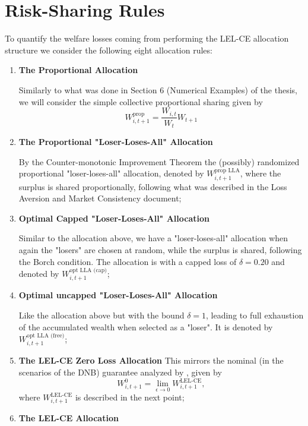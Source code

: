 \documentclass[11pt,a4paper]{article}
\theoremstyle{definition}
\theoremstyle{plain}
\theoremstyle{remark}
\newcommand{\1}{\mathbf{1}}
\begin{document}
\section{Risk-Sharing Rules}
\label{Sect:Risk-Sharing_Rules}
To quantify the welfare losses coming from performing the LEL-CE allocation structure we consider the following eight allocation rules:
\begin{enumerate}
    \item \textbf{The Proportional Allocation}
    
    Similarly to what was done in Section 6 (Numerical Examples) of the thesis, we will consider the simple collective proportional sharing given by
    \begin{equation*}
        W_{i,t+1}^{\text{prop}} = \frac{W_{i,t}}{W_t} W_{t+1}
    \end{equation*}

    \item \textbf{The Proportional "Loser-Loses-All" Allocation} 
    
    By the Counter-monotonic Improvement Theorem the (possibly) randomized proportional "loser-loses-all" allocation, denoted by $W_{i,t+1}^{\text{prop LLA}}$, where the surplus is shared proportionally, following what was described in the Loss Aversion and Market Consistency document;
    \item \textbf{Optimal Capped "Loser-Loses-All" Allocation}
    
    Similar to the allocation above, we have a "loser-loses-all" allocation when again the "losers" are chosen at random, while the surplus is shared, following the Borch condition. The allocation is with a capped loss of $\delta = 0.20$ and denoted by $W_{i,t+1}^{\text{opt LLA (cap)}}$;

    \item \textbf{Optimal uncapped "Loser-Loses-All" Allocation}
    
    Like the allocation above but with the bound $\delta = 1$, leading to full exhaustion of the accumulated wealth when selected as a "loser". It is denoted by $W_{i,t+1}^{\text{opt LLA (free)}}$;
    \item \textbf{The LEL-CE Zero Loss Allocation}
    This mirrors the nominal (in the scenarios of the DNB) guarantee analyzed by \citet{KokkenNijmanWerker2024}, given by
    \begin{equation*}
        W_{i,t+1}^0 = \lim_{\epsilon \to 0} W_{i,t+1}^{\text{LEL-CE}},
    \end{equation*}
    where $W_{i,t+1}^{\text{LEL-CE}}$ is described in the next point;
    \item \textbf{The LEL-CE Allocation}
    

\end{enumerate}
\end{document}
